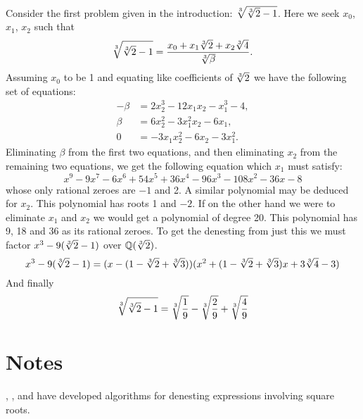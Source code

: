 Consider the first problem given in the introduction: 
$\root 3 \of {\root 3 \of 2 -1 }$.
Here we seek $x_0$, $x_1$, $x_2$ such that 
\[
\root 3 \of {\root 3 \of 2 -1 } =
{x_0 + x_1 \root 3 \of 2 + x_2 \root 3 \of 4 \over \root 3 \of \beta}.
\]
Assuming $x_0$ to be 1 and equating like coefficients of $\root 3 \of 2$
we have the following set of equations: \
\[
\begin{aligned}
- \beta &= 2 x_2^3 - 12x_1 x_2 - x_1^3 - 4,\\
\beta &= 6 x_2^2 - 3 x_1^2 x_2 - 6 x_1,\\
0 &= -3 x_1 x_2^2 - 6 x_2 - 3 x_1^2.
\end{aligned}
\]
Eliminating $\beta$ from the first two equations, and then eliminating $x_2$
from the remaining two equations, we get the following equation which $x_1$
must satisfy: 
\[
x^9 - 9 x^7 - 6 x^6 + 54 x^5 + 36 x^4 - 96 x^3 - 108 x^2 - 36 x - 8
\]
whose only rational zeroes are $-1$ and 2.  A similar polynomial may be deduced
for $x_2$.  This polynomial has roots 1 and $-2$.  If on the other
hand we were to eliminate $x_1$ and $x_2$ we would get a polynomial
of degree 20.  This polynomial has 9, 18 and 36 as its rational zeroes.
To get the denesting from just this we must
factor $x^3 - 9 (\root 3 \of 2 - 1)$ over $\Q(\root 3 \of 2)$.
\[
x^3 - 9(\root 3 \of 2 - 1) = (x - (1 - \root 3 \of 2 + \root 3 \of 3))
(x^2 + (1 - \root 3 \of 2 + \root 3 \of 3)x + 3 \root 3 \of 4 - 3)
\]
And finally 
\[
\root 3 \of {\root 3 \of 2 -1} = \root 3 \of {1 \over 9} 
- \root 3 \of {2 \over 9} + \root 3 \of {4 \over 9}
\]


\section*{Notes}

\footnotesize

 {\Borodin}, {\Fagin},
{\Hopcroft} and {\Tompa} \cite{Borodin:Radicals} have developed
algorithms for denesting expressions involving square roots.

\normalsize
